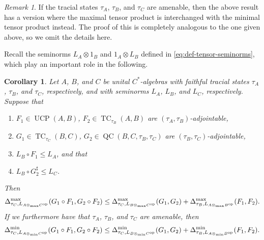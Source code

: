 \documentclass[11pt, a4paper, oneside, final, reqno]{amsart}
\newcommand{\UCP}{\operatorname{UCP}}
\newcommand{\QC}{\operatorname{QC}}
\newcommand{\TC}{\operatorname{TC}}
\theoremstyle{definition}
\theoremstyle{plain}
\newtheorem{corollary}[definition]{Corollary}
\theoremstyle{remark}
\newtheorem{remark}[definition]{Remark}
\numberwithin{equation}{section}
\begin{document}
\begin{remark}\label{rem:Chaining 1 for spatial norm}
    If the tracial states $\tau_A$, $\tau_B$, and $\tau_C$ are amenable, then the above result has a version where the maximal tensor product is interchanged with the minimal tensor product instead. The proof of this is completely analogous to the one given above, so we omit the details here.
\end{remark}

Recall the seminorms $L_A \otimes 1_B$ and $1_A \otimes L_B$ defined in \eqref{eq:def-tensor-seminorms}, which play an important role in the following.

\begin{corollary}\label{cor:chaining 2}
    Let $A$, $B$, and $C$ be unital $C^*$-algebras with faithful tracial states $\tau_A$, $\tau_B$, and $\tau_C$, respectively, and with seminorms $L_A$, $L_B$, and $L_C$, respectively. Suppose that
    \begin{enumerate}
        \item $F_1 \in \UCP(A,B)$, $F_2 \in \TC_{\tau_B}(A,B)$ are $(\tau_A,\tau_B)$-adjointable,
        \item $G_1 \in \TC_{\tau_C}(B,C)$, $G_2 \in \QC(B,C, \tau_B, \tau_C)$ are $(\tau_B,\tau_C)$-adjointable,
        \item $L_B \circ F_1 \leq L_A$, and that
        \item $L_B \circ G_2^\sharp \leq L_C$.
    \end{enumerate}
    Then
    \begin{equation*}
        \Delta_{\tau_C,L_{A \otimes_{\rm max} C^{\rm op}}}^{\rm max}(G_1 \circ F_1, G_2 \circ F_2)
        \leq \Delta_{\tau_C,L_{B \otimes_{\rm max} C^{\rm op}}}^{\rm max}(G_1, G_2) + \Delta_{\tau_B,L_{A \otimes_{\rm max} B^{\rm op}}}^{\rm max}(F_1, F_2).
    \end{equation*}
    If we furthermore have that $\tau_A$, $\tau_B$, and $\tau_C$ are amenable, then
    \begin{equation*}
        \Delta_{\tau_C,L_{A \otimes_{\rm min} C^{\rm op}}}^{\rm min}(G_1 \circ F_1, G_2 \circ F_2)
        \leq \Delta_{\tau_C,L_{B \otimes_{\rm min} C^{\rm op}}}^{\rm min}(G_1, G_2) + \Delta_{\tau_B,L_{A \otimes_{\rm min} B^{\rm op}}}^{\rm min}(F_1, F_2).
    \end{equation*}
\end{corollary}
\end{document}
